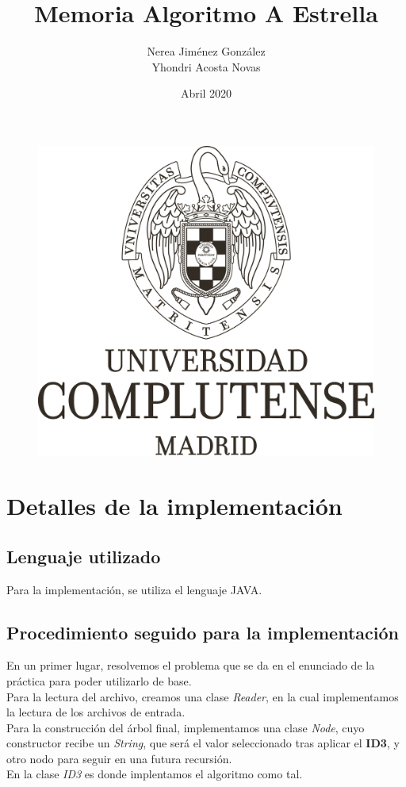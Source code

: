 \documentclass[12pt]{article}
\title{Memoria Algoritmo A Estrella}
\author{Nerea Jiménez González\\ Yhondri Acosta Novas}
\date{Abril 2020}
\begin{document}
\maketitle
\begin{figure}[H]
    \centering
    \includegraphics[width=1\textwidth]{3-2016-07-21-Marca UCM Monocromo Negro.png}
\end{figure}

\newpage
\tableofcontents
\listoffigures
\newpage

\section{Detalles de la implementación}
\subsection{Lenguaje utilizado}
Para la implementación, se utiliza el lenguaje JAVA.
\subsection{Procedimiento seguido para la implementación}
En un primer lugar, resolvemos el problema que se da en el enunciado de la práctica para poder utilizarlo de base.\\
Para la lectura del archivo, creamos una clase \textit{Reader}, en la cual implementamos la lectura de los archivos de entrada.\\
Para la construcción del árbol final, implementamos una clase \textit{Node}, cuyo constructor recibe un \textit{String}, que será el valor seleccionado tras aplicar el \textbf{ID3}, y otro nodo para seguir en una futura recursión.\\
En la clase \textit{ID3} es donde implentamos el algoritmo como tal. 
\end{document}
